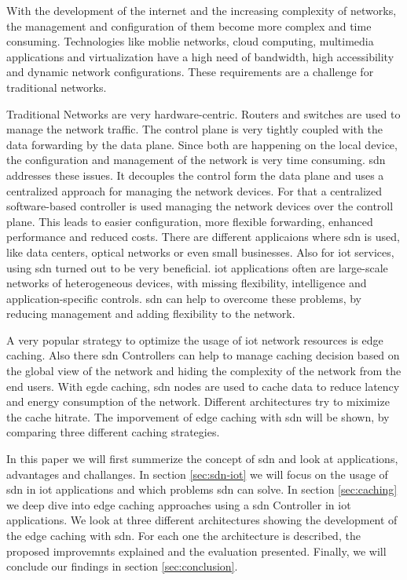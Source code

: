 \documentclass[conference]{IEEEtran}
\begin{document}
	With the development of the internet and the increasing complexity of networks, the management and configuration of them become more complex and time consuming. Technologies like moblie networks, cloud computing, multimedia applications and virtualization have a high need of bandwidth, high accessibility and dynamic network configurations. These requirements are a challenge for traditional networks. 

	Traditional Networks are very hardware-centric. Routers and switches are used to manage the network traffic. The control plane is very tightly coupled with the data forwarding by the data plane. Since both are happening on the local device, the configuration and management of the network is very time consuming. \acf{sdn} addresses these issues. It decouples the control form the data plane and uses a centralized approach for managing the network devices. For that a centralized software-based controller is used managing the network devices over the controll plane. This leads to easier configuration, more flexible forwarding, enhanced performance and reduced costs. \cite{Jefia2018-pj} \cite{MASOUDI20161} There are different applicaions where \ac{sdn} is used, like data centers, optical networks or even small businesses. Also for \ac{iot} services, using \ac{sdn} turned out to be very beneficial. \ac{iot} applications often are large-scale networks of heterogeneous devices, with missing flexibility, intelligence and application-specific controls. \ac{sdn} can help to overcome these problems, by reducing management and adding flexibility to the network.


	A very popular strategy to optimize the usage of \ac{iot} network resources is edge caching. Also there \ac{sdn} Controllers can help to manage caching decision based on the global view of the network and hiding the complexity of the network from the end users. With egde caching, \ac{sdn} nodes are used to cache data to reduce latency and energy consumption of the network. Different architectures try to miximize the cache hitrate. The imporvement of edge caching with \ac{sdn} will be shown, by comparing three different caching strategies.


	In this paper we will first summerize the concept of \ac{sdn} and look at applications, advantages and challanges. In section \ref{sec:sdn-iot} we will focus on the usage of \ac{sdn} in \ac{iot} applications and which problems \ac{sdn} can solve. In section \ref{sec:caching} we deep dive  into edge caching approaches using a \ac{sdn} Controller in \ac{iot} applications. We look at three different architectures showing the development of the edge caching with \ac{sdn}. For each one the architecture is described, the proposed improvemnts explained and the evaluation presented. Finally, we will conclude our findings in section \ref{sec:conclusion}. 
\end{document}
